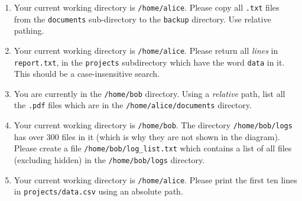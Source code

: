 \documentclass[11pt]{article}
\begin{document}
\begin{enumerate}

\item Your current working directory is \texttt{/home/alice}. Please copy all \texttt{.txt} files from the \texttt{documents} sub-directory to the \texttt{backup} directory. Use relative pathing.
\vspace{1.25cm}

\item Your current working directory is \texttt{/home/alice}. Please return all \emph{lines} in \texttt{report.txt}, in the \texttt{projects} subdirectory which have the word \texttt{data} in it. This should be a case-insensitive search.
\vspace{1.25cm}

\item You are currently in the \texttt{/home/bob} directory. Using a \emph{relative} path, list all the \texttt{.pdf} files which are in the \texttt{/home/alice/documents} directory.
\vspace{1.25cm}

\item Your current working directory is \texttt{/home/bob}. The directory \texttt{/home/bob/logs} has over 300 files in it (which is why they are not shown in the diagram).  Please create a file \texttt{/home/bob/log\_list.txt} which contains a list of all files (excluding hidden) in the \texttt{/home/bob/logs} directory.
\vspace{1.25cm}

\item Your current working directory is \texttt{/home/alice}. Please print the first ten lines in \texttt{projects/data.csv} using an absolute path.

\end{enumerate}
\end{document}

